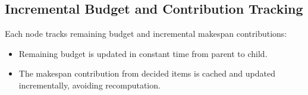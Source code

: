 \subsection{Incremental Budget and Contribution Tracking}

Each node tracks remaining budget and incremental makespan contributions:
\begin{itemize}
    \item Remaining budget is updated in constant time from parent to child.
    \item The makespan contribution from decided items is cached and updated incrementally, avoiding recomputation.
\end{itemize}
